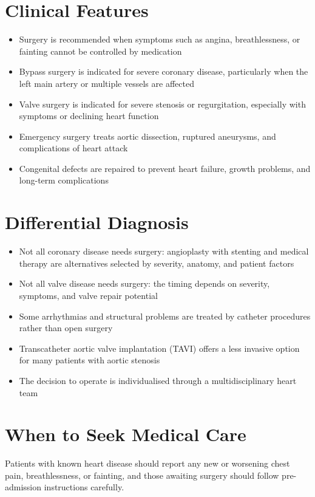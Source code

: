 \section*{Clinical Features}
\begin{itemize}
    \item Surgery is recommended when symptoms such as angina, breathlessness, or fainting cannot be controlled by medication
    \item Bypass surgery is indicated for severe coronary disease, particularly when the left main artery or multiple vessels are affected
    \item Valve surgery is indicated for severe stenosis or regurgitation, especially with symptoms or declining heart function
    \item Emergency surgery treats aortic dissection, ruptured aneurysms, and complications of heart attack
    \item Congenital defects are repaired to prevent heart failure, growth problems, and long-term complications
\end{itemize}

\section*{Differential Diagnosis}
\begin{itemize}
    \item Not all coronary disease needs surgery: angioplasty with stenting and medical therapy are alternatives selected by severity, anatomy, and patient factors
    \item Not all valve disease needs surgery: the timing depends on severity, symptoms, and valve repair potential
    \item Some arrhythmias and structural problems are treated by catheter procedures rather than open surgery
    \item Transcatheter aortic valve implantation (TAVI) offers a less invasive option for many patients with aortic stenosis
    \item The decision to operate is individualised through a multidisciplinary heart team
\end{itemize}

\section*{When to Seek Medical Care}
Patients with known heart disease should report any new or worsening chest pain, breathlessness, or fainting, and those awaiting surgery should follow pre-admission instructions carefully.

